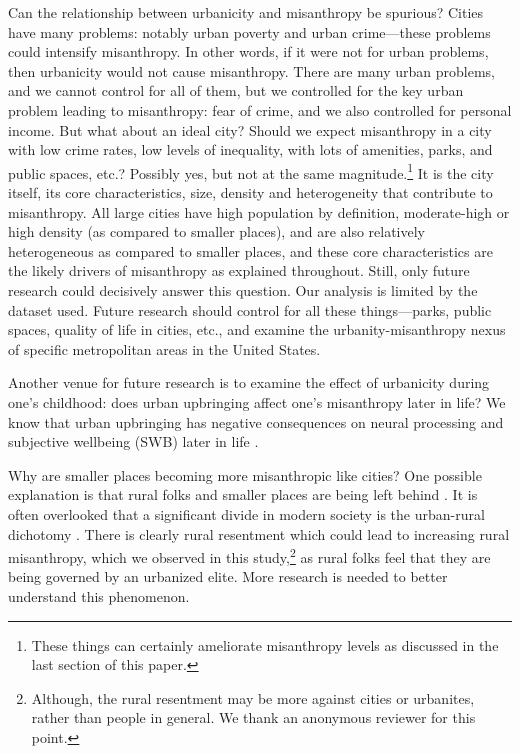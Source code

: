 \documentclass[11pt, letterpaper]{article}
\begin{document}
\begin{spacing}{1.4}
Can the relationship between urbanicity and misanthropy be spurious? Cities have many problems: notably urban poverty and urban crime---these problems could intensify misanthropy. In other words, if it were not for urban problems, then urbanicity would not cause misanthropy. There are many urban problems, and we cannot control for all of them, but we controlled for the key urban problem leading to misanthropy: fear of crime, and we also controlled for personal income. 
But what about an ideal city? Should we expect misanthropy in a city with low crime rates, low levels of inequality, with lots of amenities, parks, and public spaces, etc.? Possibly yes, but not at the same magnitude.\footnote{These things can certainly ameliorate misanthropy levels as discussed in the last section of this paper.} It is the city itself, its core characteristics, size, density and heterogeneity that contribute to misanthropy. All large cities have high population by definition, moderate-high or high density (as compared to smaller places), and are also relatively heterogeneous as compared to smaller places, and these core characteristics are the likely drivers of misanthropy as explained throughout.
%
Still, only future research could decisively  answer this question. Our analysis is limited by the dataset used. Future research should control for all these things---parks, public spaces, quality of life in cities, etc., and examine the urbanity-misanthropy nexus of specific metropolitan areas in the United States. 

Another venue for future research is to examine the effect of urbanicity during
one's childhood: does urban upbringing affect one's misanthropy later in life?
We know that urban upbringing has negative consequences on neural processing and
subjective wellbeing (SWB) later in life \citep{lederbogen11,aok20}. 

Why are smaller places becoming more misanthropic like cities? One possible
explanation is that rural folks and smaller places are being left behind
\citep{aokCityBook15}. It is often overlooked that a significant divide in
modern society is the urban-rural dichotomy
\citep{hansonCityJournalautumn15,hansonCJ17winter17}. There is clearly rural
resentment which could lead to increasing rural misanthropy, which we observed
in this study,\footnote{Although, the rural resentment may be more against
  cities or urbanites, rather than people in general. We thank an anonymous
  reviewer for this point.} as rural folks feel that they are being governed by an urbanized elite. More research is needed to better understand this phenomenon.


\end{spacing}
\end{document}
